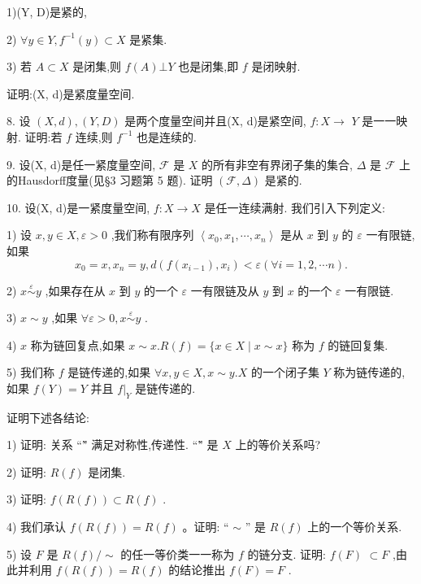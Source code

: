 1)(Y, D)是紧的,

2) $\forall y \in  Y,{f}^{-1}\left( y\right)  \subset  X$ 是紧集.

3) 若 $A \subset  X$ 是闭集,则 $f\left( A\right) \bot Y$ 也是闭集,即 $f$ 是闭映射.

证明:(X, d)是紧度量空间.

8. 设 $\left( {X,d}\right) ,\left( {Y,D}\right)$ 是两个度量空间并且(X, d)是紧空间, $f : X \rightarrow$  $Y$ 是一一映射. 证明:若 $f$ 连续,则 ${f}^{-1}$ 也是连续的.

9. 设(X, d)是任一紧度量空间, $\mathcal{F}$ 是 $X$ 的所有非空有界闭子集的集合, $\Delta$ 是 $\mathcal{F}$ 上的Hausdorff度量(见§3 习题第 5 题). 证明 $\left( {\mathcal{F},\Delta }\right)$ 是紧的.

10. 设(X, d)是一紧度量空间, $f : X \rightarrow  X$ 是任一连续满射. 我们引入下列定义:

1) 设 $x,y \in  X,\varepsilon  > 0$ ,我们称有限序列 $\left\langle  {{x}_{0},{x}_{1},\cdots ,{x}_{n}}\right\rangle$ 是从 $x$ 到 $y$ 的 $\varepsilon$ 一有限链,如果
$${x}_{0} = x,{x}_{n} = y,d\left( {f\left( {x}_{i - 1}\right) ,{x}_{i}}\right)  < \varepsilon \left( {\forall i = 1,2,\cdots n}\right) .$$

2) $x\overset{\varepsilon }{ \sim  }y$ ,如果存在从 $x$ 到 $y$ 的一个 $\varepsilon$ 一有限链及从 $y$ 到 $x$ 的一个 $\varepsilon$ 一有限链.

3) $x \sim  y$ ,如果 $\forall \varepsilon  > 0,x\overset{\varepsilon }{ \sim  }y$ .

4) $x$ 称为链回复点,如果 $x \sim  x.R\left( f\right)  = \{ x \in  X \mid  x \sim  x\}$ 称为 $f$ 的链回复集.

5) 我们称 $f$ 是链传递的,如果 $\forall x,y \in  X,x \sim  y.X$ 的一个闭子集 $Y$ 称为链传递的,如果 $f\left( Y\right)  = Y$ 并且 ${\left. f\right| }_{Y}$ 是链传递的.

证明下述各结论:

1) 证明: 关系 “\~” 满足对称性,传递性. “\~” 是 $X$ 上的等价关系吗?

2) 证明: $R\left( f\right)$ 是闭集.

3) 证明: $f\left( {R\left( f\right) }\right)  \subset  R\left( f\right)$ .

4) 我们承认 $f\left( {R\left( f\right) }\right)  = R\left( f\right)$ 。证明: “ $\sim$ ” 是 $R\left( f\right)$ 上的一个等价关系.

5) 设 $F$ 是 $R\left( f\right) / \sim$ 的任一等价类一一称为 $f$ 的链分支. 证明: $f\left( F\right)$  $\subset  F$ ,由此并利用 $f\left( {R\left( f\right) }\right)  = R\left( f\right)$ 的结论推出 $f\left( F\right)  = F$ .

